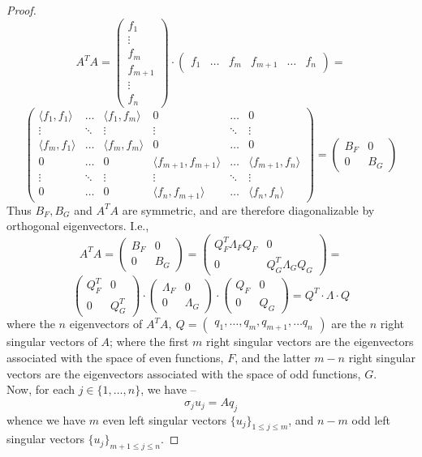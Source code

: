 \documentclass[11pt]{article}
\theoremstyle{quest}
\begin{document}
\begin{proof}
$$A^TA = \begin{pmatrix}
f_1 \\ \vdots \\ f_m \\ f_{m+1} \\ \vdots \\ f_n
\end{pmatrix} \cdot \begin{pmatrix}
f_1 & \ldots & f_m & f_{m+1} & \ldots & f_n
\end{pmatrix} =$$
$$\begin{pmatrix}
\langle f_1, f_1 \rangle & \ldots & \langle f_1, f_m \rangle & 0 & \ldots & 0 \\
\vdots & \ddots & \vdots & \vdots & \ddots & \vdots \\
\langle f_m, f_1 \rangle & \ldots & \langle f_m, f_m \rangle & 0 & \ldots & 0 \\
0 & \ldots & 0 & \langle f_{m+1}, f_{m+1} \rangle & \ldots & \langle f_{m+1}, f_n \rangle 
 \\
\vdots & \ddots & \vdots & \vdots & \ddots & \vdots \\
0 & \ldots & 0 & \langle f_n, f_{m+1} \rangle & \ldots & \langle f_n, f_n \rangle 
\end{pmatrix} = \begin{pmatrix}
B_F & 0 \\
0 & B_G
\end{pmatrix} $$
Thus $B_F, B_G$ and $A^TA$ are symmetric, and are therefore diagonalizable by orthogonal eigenvectors. I.e.,
$$A^TA = \begin{pmatrix}
B_F & 0 \\
0 & B_G
\end{pmatrix} = \begin{pmatrix}
Q^T_F \Lambda_F Q_F & 0 \\
0 & Q^T_G \Lambda_G Q_G
\end{pmatrix} =$$
$$\begin{pmatrix}
Q^T_F & 0 \\
0 & Q^T_G
\end{pmatrix}  \cdot \begin{pmatrix}
\Lambda_F & 0 \\
0 & \Lambda_G
\end{pmatrix}  \cdot \begin{pmatrix}
Q_F & 0 \\
0 & Q_G
\end{pmatrix}  = Q^T \cdot \Lambda \cdot Q$$
where the $n$ eigenvectors of $A^TA,\ Q = \begin{pmatrix}
q_1, \ldots, q_m, q_{m+1}, \ldots q_n
\end{pmatrix}$ are the $n$ right singular vectors of $A$; where the first $m$ right singular vectors are the eigenvectors associated with the space of even functions, $F$, and the latter $m-n$ right singular vectors are the eigenvectors associated with the space of odd functions, $G$.
\\Now, for each $j \in \{1, \ldots, n\}$, we have --
$$\sigma_j u_j = Aq_j$$
whence we have $m$ even left singular vectors $\{u_j\}_{1 \le j \le m}$, and $n-m$ odd left singular vectors $\{u_j\}_{m+1 \le j \le n}$.
\end{proof}
\end{document}

